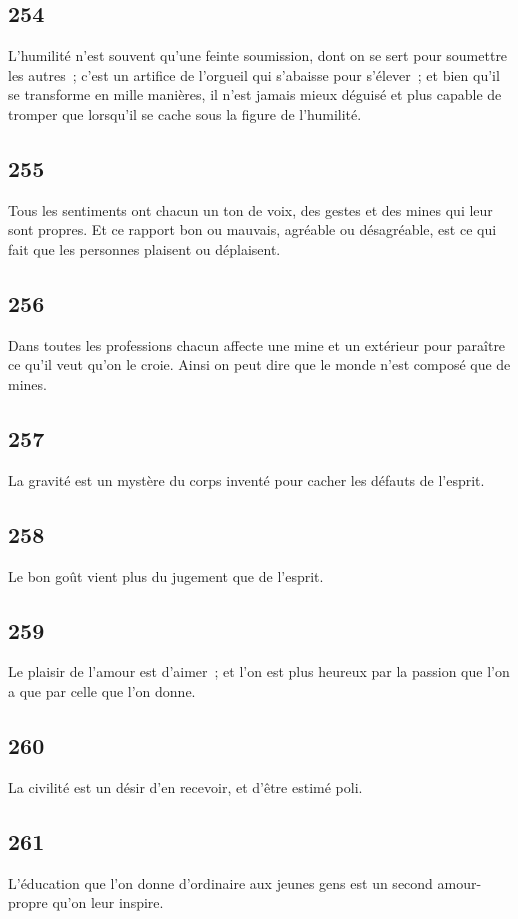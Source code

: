 \documentclass[french,twoside]{book} %
\begin{document}
\subsection[{254}]{ \textsc{254} }
\noindent L’humilité n’est souvent qu’une feinte soumission, dont on se sert pour soumettre les autres ; c’est un artifice de l’orgueil qui s’abaisse pour s’élever ; et bien qu’il se transforme en mille manières, il n’est jamais mieux déguisé et plus capable de tromper que lorsqu’il se cache sous la figure de l’humilité.
\subsection[{255}]{ \textsc{255} }
\noindent Tous les sentiments ont chacun un ton de voix, des gestes et des mines qui leur sont propres. Et ce rapport bon ou mauvais, agréable ou désagréable, est ce qui fait que les personnes plaisent ou déplaisent.
\subsection[{256}]{ \textsc{256} }
\noindent Dans toutes les professions chacun affecte une mine et un extérieur pour paraître ce qu’il veut qu’on le croie. Ainsi on peut dire que le monde n’est composé que de mines.
\subsection[{257}]{ \textsc{257} }
\noindent La gravité est un mystère du corps inventé pour cacher les défauts de l’esprit.
\subsection[{258}]{ \textsc{258} }
\noindent Le bon goût vient plus du jugement que de l’esprit.
\subsection[{259}]{ \textsc{259} }
\noindent Le plaisir de l’amour est d’aimer ; et l’on est plus heureux par la passion que l’on a que par celle que l’on donne.
\subsection[{260}]{ \textsc{260} }
\noindent La civilité est un désir d’en recevoir, et d’être estimé poli.
\subsection[{261}]{ \textsc{261} }
\noindent L’éducation que l’on donne d’ordinaire aux jeunes gens est un second amour-propre qu’on leur inspire.
\end{document}

